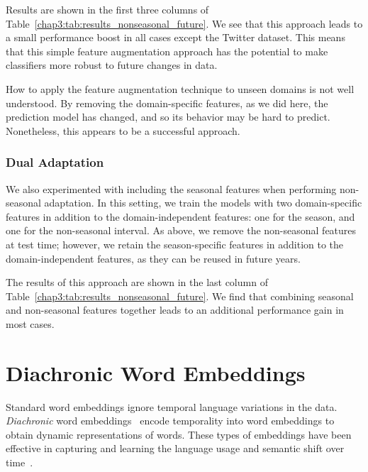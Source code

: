 Results are shown in the first three columns of Table~\ref{chap3:tab:results_nonseasonal_future}.
We see that this approach leads to a small performance boost in all cases except the Twitter dataset. 
This means that this simple feature augmentation approach has the potential to make classifiers more robust to future changes in data.

How to apply the feature augmentation technique to unseen domains is not well understood.
By removing the domain-specific features, as we did here, the prediction model has changed, and so its behavior may be hard to predict.
Nonetheless, this appears to be a successful approach.

\subsubsection{Dual Adaptation}

We also experimented with including the seasonal features when performing non-seasonal adaptation.
In this setting, we train the models with two domain-specific features in addition to the domain-independent features: one for the season, and one for the non-seasonal interval. 
As above, we remove the non-seasonal features at test time; however, we retain the season-specific features in addition to the domain-independent features, as they can be reused in future years.

The results of this approach are shown in the last column of Table~\ref{chap3:tab:results_nonseasonal_future}.
We find that combining seasonal and non-seasonal features together leads to an additional performance gain in most cases.


\section{Diachronic Word Embeddings}
\label{chap3:sec:dwe}

Standard word embeddings ignore temporal language variations in the data. %
\textit{Diachronic} word embeddings~\cite{kulkarni2015statistically} 
encode temporality into word embeddings to obtain dynamic representations of words. 
These types of embeddings have been effective in capturing and learning the language usage and semantic shift over time~\cite{kim2014temporal, kulkarni2015statistically, hamilton2016diachronic, bamler2017dynamic, szymanski2017temporal, rudolph2018dynamic, rosenfeld2018deep, yao2018dynamic}. 

